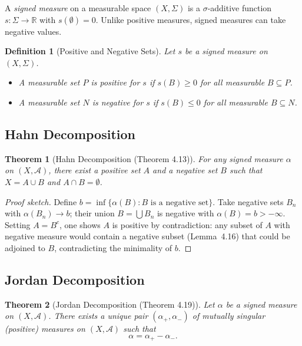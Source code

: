\documentclass[11pt]{article}
\newtheorem{theorem}{Theorem}
\newtheorem{definition}{Definition}
\begin{document}
A \emph{signed measure} on a measurable space $(X, \Sigma)$ is a $\sigma$-additive function $s : \Sigma \to \mathbb{R}$ with $s(\emptyset) = 0$. Unlike positive measures, signed measures can take negative values.

\begin{definition}[Positive and Negative Sets]
Let $s$ be a signed measure on $(X, \Sigma)$.
\begin{itemize}
    \item A measurable set $P$ is \emph{positive} for $s$ if $s(B) \geq 0$ for all measurable $B \subseteq P$.
    \item A measurable set $N$ is \emph{negative} for $s$ if $s(B) \leq 0$ for all measurable $B \subseteq N$.
\end{itemize}
\end{definition}

\subsection{Hahn Decomposition}

\begin{theorem}[Hahn Decomposition (Theorem 4.13)]
For any signed measure $\alpha$ on $(X, \mathcal{A})$, there exist a positive set $A$ and a negative set $B$ such that $X = A \cup B$ and $A \cap B = \emptyset$.
\end{theorem}

\begin{proof}[Proof sketch]
Define $b = \inf\{\alpha(B) : B \text{ is a negative set}\}$. Take negative sets $B_n$ with $\alpha(B_n) \to b$; their union $B = \bigcup B_n$ is negative with $\alpha(B) = b > -\infty$. Setting $A = B^c$, one shows $A$ is positive by contradiction: any subset of $A$ with negative measure would contain a negative subset (Lemma~4.16) that could be adjoined to $B$, contradicting the minimality of $b$.
\end{proof}

\subsection{Jordan Decomposition}

\begin{theorem}[Jordan Decomposition (Theorem 4.19)]
Let $\alpha$ be a signed measure on $(X, \mathcal{A})$. There exists a unique pair $(\alpha_+, \alpha_-)$ of mutually singular (positive) measures on $(X, \mathcal{A})$ such that
\[
\alpha = \alpha_+ - \alpha_-.
\]
\end{theorem}
\end{document}
